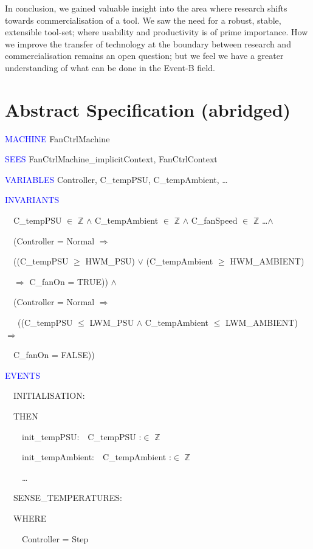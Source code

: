 \documentclass{llncs}%
\begin{document}
In conclusion, we gained valuable insight into the area where research shifts towards commercialisation of a tool. We saw the need for a robust, stable, extensible tool-set; where usability and productivity is of prime importance. How we improve the transfer of technology at the boundary between research and commercialisation remains an open question; but we feel we have a greater understanding of what can be done in the Event-B field.
%


%
%
%
\appendix
%
%
%
\section{Abstract Specification (abridged)}\label{abst}
\textcolor{blue}{MACHINE} FanCtrlMachine 

\textcolor{blue}{SEES} FanCtrlMachine\_implicitContext, FanCtrlContext 

\textcolor{blue}{VARIABLES} Controller, C\_tempPSU, C\_tempAmbient, \ldots \ \  \ 

\textcolor{blue}{INVARIANTS}

\ \ C\_tempPSU ${\in}$ $\mathbb{Z}$  ${\wedge}$ C\_tempAmbient ${\in}$ $\mathbb{Z}$  ${\wedge}$ C\_fanSpeed ${\in}$ $\mathbb{Z}$ \ldots ${\wedge}$ \ 

\ \ (Controller = Normal $\Rightarrow $ \

 \ \ ((C\_tempPSU ${\geq}$ HWM\_PSU) ${\vee}$ (C\_tempAmbient ${\geq}$
HWM\_AMBIENT)\

\ \ \quad $\Rightarrow $ C\_fanOn = TRUE)) ${\wedge}$\ \  \ 

\ \ (Controller = Normal $\Rightarrow $

\ \   \ ((C\_tempPSU ${\leq}$ LWM\_PSU ${\wedge}$ C\_tempAmbient ${\leq}$
LWM\_AMBIENT) $\Rightarrow $ \

\ \ \quad C\_fanOn = FALSE))\ \ 

\bigskip
\textcolor{blue}{EVENTS}

\ \ INITIALISATION:\ \ 

\ \ THEN

\ \ \ \ init\_tempPSU:\ \ C\_tempPSU :${\in}$ $\mathbb{Z}$ 

\ \ \ \ init\_tempAmbient:\ \ C\_tempAmbient :${\in}$ $\mathbb{Z}$ 

\ \ \ \ {\dots}

\bigskip

\ \ SENSE\_TEMPERATURES:\ \  \ 

\ \ WHERE

\ \ \ \ Controller = Step \ \ 
\end{document}
